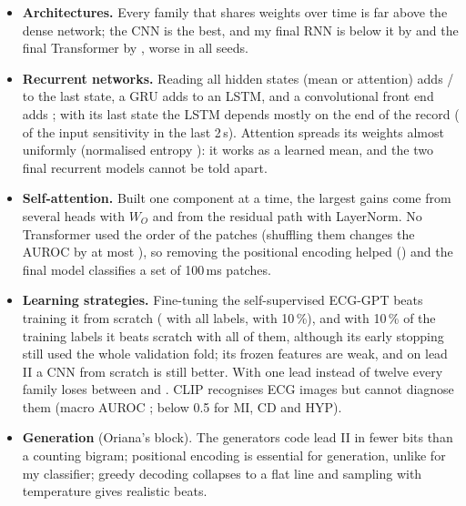 \begin{itemize}[leftmargin=1.2em,itemsep=1pt,topsep=2pt]
  \item \textbf{Architectures.} Every family that shares weights over time is far above the dense network;
        the CNN is the best, and my final RNN is below it by \rnnDiffCnnMean{} and the final Transformer by
        \transformerDiffCnnMean{}, worse in all seeds.
  \item \textbf{Recurrent networks.} Reading all hidden states (mean or attention) adds
        \rnnDiffMeanMean{} / \rnnDiffMeanAttn{} to the last state, a GRU adds \rnnDiffMeanGru{} to an LSTM,
        and a convolutional front end adds \rnnDiffMeanConv{}; with its last state the LSTM depends mostly
        on the end of the record (\rnnSensLastBase{} of the input sensitivity in the last 2\,s). Attention
        spreads its weights almost uniformly (normalised entropy \rnnAttnEntropyNormAttn{}): it works as a
        learned mean, and the two final recurrent models cannot be told apart.
  \item \textbf{Self-attention.} Built one component at a time, the largest gains come from several heads
        with $W_O$ and from the residual path with LayerNorm. No Transformer used the order of the patches
        (shuffling them changes the AUROC by at most \transformerOrderDropLayersFour{}), so removing the
        positional encoding helped (\transformerDiffMeanNoPos{}) and the final model classifies a set of
        100\,ms patches.
  \item \textbf{Learning strategies.} Fine-tuning the self-supervised ECG-GPT beats training it from
        scratch (\transferTestDiffMeanFinetuneVsScratchFOneZeroZero{} with all labels,
        \transferTestDiffMeanFinetuneVsScratchFOneZero{} with 10\,\%), and with 10\,\% of the training labels
        it beats scratch with all of them, although its early stopping still used the whole validation
        fold; its frozen features are weak, and on lead II a CNN from scratch is still better. With one lead instead of twelve every family loses between \leadsTestDiffMeanRnnattn{} and
        \leadsTestDiffMeanTransformer{}. CLIP recognises ECG images but cannot diagnose them (macro AUROC
        \zeroshotTestMacroAuroc{}; below 0.5 for MI, CD and HYP).
  \item \textbf{Generation} (Oriana's block). The generators code lead II in fewer bits than a counting
        bigram; positional encoding is essential for generation, unlike for my classifier; greedy decoding
        collapses to a flat line and sampling with temperature gives realistic beats.
\end{itemize}

